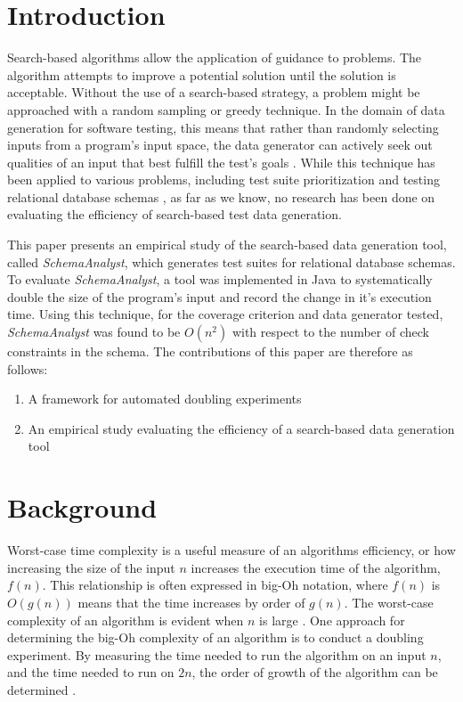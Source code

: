 \documentclass[smallextended]{svjour3}       %
\begin{document}
\section{Introduction}
Search-based algorithms allow the application of guidance to problems.
The algorithm attempts to improve a potential solution until the
solution is acceptable. Without the use of a search-based strategy, a
problem might be approached with a random sampling or greedy
technique. In the
domain of data generation for software testing, this means that rather
than randomly selecting inputs from a program's input space, the data
generator can actively seek out qualities of an input that best fulfill the test's goals \cite{McMinn:Thesis}. While this
technique has been applied to various problems, including test suite
prioritization \cite{Walcott:tsp} and testing
relational database schemas \cite{Kapfhammer2013}, 
as far as we know, no research has been done on evaluating the efficiency
of search-based test data generation. 

This paper presents an empirical study of the search-based data
generation tool, called \textit{SchemaAnalyst}, which generates test suites for
relational database schemas.  To evaluate \textit{SchemaAnalyst}, a tool
was implemented in Java to systematically double the size of the
program's input and record the change in it's execution time. Using this
technique, for the coverage criterion and data generator tested, 
\textit{SchemaAnalyst} was found to be $O(n^2)$ with respect
to the number of check constraints in the schema. The contributions of
this paper are therefore as follows:
\begin{enumerate}
  \item A framework for automated doubling experiments
  \item An empirical study evaluating the efficiency of a search-based
    data generation tool
  \end{enumerate}

\section{Background}

Worst-case time complexity is a useful measure of an algorithms
efficiency, or how increasing the size
of the input $n$ increases the execution time of the algorithm, $f(n)$.
This relationship is often expressed in big-Oh notation, where $f(n)$
is $O(g(n))$ means that the time increases by order of $g(n)$. The
worst-case complexity of an algorithm is evident when $n$ is large 
\cite{Goodrich:Data}. One approach for determining the big-Oh complexity
of an algorithm is to conduct a doubling experiment. By measuring the
time needed to run the algorithm on an input $n$, and the time needed to
run on $2n$, the order of growth of the algorithm can be determined \cite{Mcgeoch:Algorithmics,
Sedgewick:Analysis}. 
\end{document}
